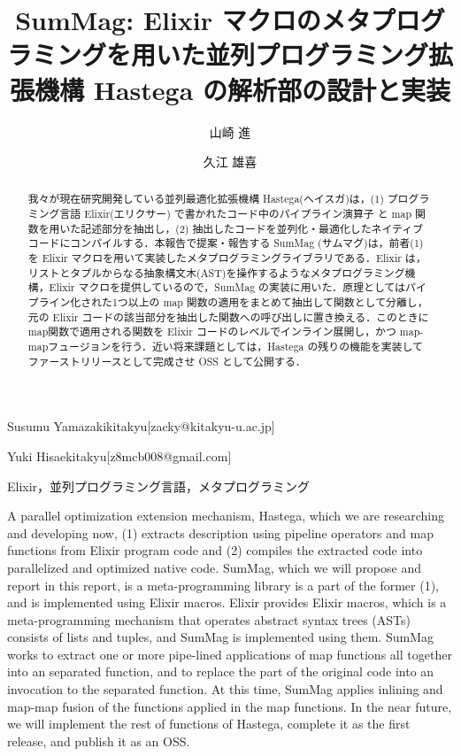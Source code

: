 \documentclass[submit,PRO]{ipsj}
\begin{document}
\title{SumMag: Elixir マクロのメタプログラミングを用いた並列プログラミング拡張機構 Hastega の解析部の設計と実装}



\author{山崎 進}{Susumu Yamazaki}{kitakyu}[zacky@kitakyu-u.ac.jp]
\author{久江 雄喜}{Yuki Hisae}{kitakyu}[z8mcb008@gmail.com]


\begin{abstract}
我々が現在研究開発している並列最適化拡張機構 Hastega(ヘイスガ)は，(1) プログラミング言語
Elixir(エリクサー) で書かれたコード中のパイプライン演算子 と map 関数を用いた記述部分を抽出し，(2)
抽出したコードを並列化・最適化したネイティブコードにコンパイルする．本報告で提案・報告する
SumMag (サムマグ)は，前者(1)を Elixir マクロを用いて実装したメタプログラミングライブラリである．Elixir
は，リストとタプルからなる抽象構文木(AST)を操作するようなメタプログラミング機構，Elixir
マクロを提供しているので，SumMag の実装に用いた．原理としてはパイプライン化された1つ以上の
map 関数の適用をまとめて抽出して関数として分離し，元の Elixir コードの該当部分を抽出した関数への呼び出しに置き換える．このときに
map関数で適用される関数を Elixir コードのレベルでインライン展開し，かつ
map-mapフュージョンを行う．近い将来課題としては，Hastega の残りの機能を実装してファーストリリースとして完成させ
OSS として公開する．
\end{abstract}


\begin{jkeyword}
Elixir，並列プログラミング言語，メタプログラミング
\end{jkeyword}


\begin{eabstract}
A parallel optimization extension mechanism, Hastega, which we are
researching and developing now, (1) extracts description using pipeline
operators and map functions from Elixir program code and (2) compiles
the extracted code into parallelized and optimized native code. SumMag,
which we will propose and report in this report, is a
meta-programming library is a part of the former (1), and is implemented
using Elixir macros. Elixir provides Elixir macros, which is a
meta-programming mechanism that operates abstract syntax trees (ASTs)
consists of lists and tuples, and SumMag is implemented using them.
SumMag works to extract one or more pipe-lined applications of map
functions all together into an separated function, and to replace the
part of the original code into an invocation to the separated function.
At this time, SumMag applies inlining and map-map fusion of the
functions applied in the map functions. In the near future, we will
implement the rest of functions of Hastega, complete it as the first
release, and publish it as an OSS.
\end{eabstract}
\end{document}

